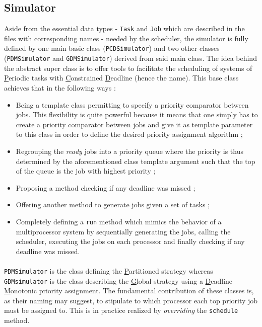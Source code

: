 \documentclass[a4paper]{article}
\begin{document}
\subsection{Simulator}
Aside from the essential data types - \texttt{Task} and \texttt{Job} which are described in the files with corresponding names - needed by the scheduler, the simulator is fully defined by one main basic class (\texttt{PCDSimulator}) and two other classes (\texttt{PDMSimulator} and \texttt{GDMSimulator}) derived from said main class. The idea behind the abstract super class is to offer tools to facilitate the scheduling of systems of \underline{P}eriodic tasks with \underline{C}onstrained \underline{D}eadline (hence the name).
This base class achieves that in the following ways : 
\begin{itemize}
	\item Being a template class permitting to specify a priority comparator between jobs. This flexibility is quite powerful because it means that one simply has to create a priority comparator between jobs and give it as template parameter to this class in order to define the desired priority assignment algorithm ;
	\item Regrouping the \textit{ready} jobs into a priority queue where the priority is thus determined by the aforementioned class template argument such that the top of the queue is the job with highest priority ;
	\item Proposing a method checking if any deadline was missed ;
	\item Offering another method to generate jobs given a set of tasks ;
	\item Completely defining a \texttt{run} method which mimics the behavior of a multiprocessor system by sequentially generating the jobs, calling the scheduler, executing the jobs on each processor and finally checking if any deadline was missed.	
\end{itemize}
\paragraph{}
\texttt{PDMSimulator} is the class defining the \underline{P}artitioned strategy whereas \texttt{GDMsimulator} is the class describing the \underline{G}lobal strategy using a \underline{D}eadline \underline{M}onotonic priority assignment. The fundamental contribution of these classes is, as their naming may suggest, to stipulate to which processor each top priority job must be assigned to. This is in practice realized by \textit{overriding} the \texttt{schedule} method. 
\end{document}
